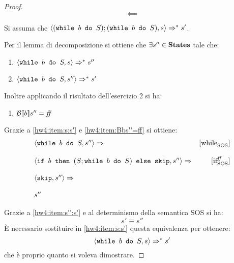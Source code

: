 {\begin{proof}
$$\boxed{\impliedby}$$

Si assuma che $\confSs{(\wbS{b}{S}); (\wbS{b}{S})}{s} \Rar{*} s'$.


Per il lemma di decomposizione si ottiene che $\exists s'' \in \states$ tale che:
\begin{enumerate}[label=(\Roman*)]
	\item $\confSs{\wbS{b}{S}}{s} \Rar{*} s''$
	\label{hw4:item:s:s'}
	\item $\confSs{\wbS{b}{S}}{s''} \Rar{*} s'$
	\label{hw4:item:s'':s'}
\end{enumerate}
Inoltre applicando il risultato dell'esercizio 2 si ha:
\begin{enumerate}[label=(\alph*)]
	\item $\B{b}'' = \semfalse$
	\label{hw4:item:Bbs''=ff}
\end{enumerate}
Grazie a \ref{hw4:item:s:s'} e \ref{hw4:item:Bbs''=ff} si ottiene:
$$
\begin{array}{lr}
\confSs{\wbS{b}{S}}{s''} \Rar{}& \whileSOS\\
& \\
\confSs{\ifABC{b}{(S; \wbS{b}{S})}{\skipForFriends}}{s''} \Rar{}& \ifffSOS \\
 & \\
\confSs{\skipForFriends}{s''} \Rar{}& \\
& \\
s''
\end{array}
$$


Grazie a \ref{hw4:item:s'':s'} e al determinismo della semantica SOS
si ha: 
$$
s' \equiv{ } s''
$$
È necessario sostituire in \ref{hw4:item:s:s'} questa equivalenza per ottenere:
$$
\confSs{\wbS{b}{S}}{s} \Rar{*} s'
$$ 
che è proprio quanto si voleva dimostrare.
\end{proof}
}
